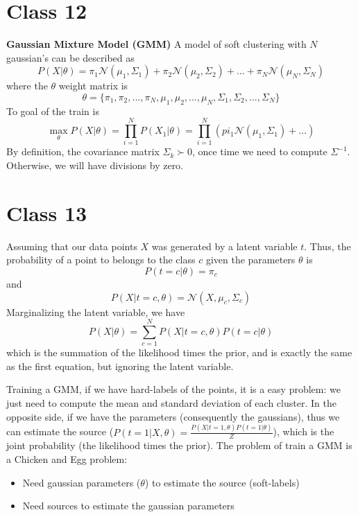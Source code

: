 \documentclass{article}
\begin{document}
\section{Class 12}
\textbf{Gaussian Mixture Model (GMM)}
A model of soft clustering with $N$ gaussian's can be described as
\begin{equation}
    P(X|\theta) = \pi_1\mathcal{N}(\mu_1, \Sigma_1) + \pi_2\mathcal{N}(\mu_2, \Sigma_2) + ... + \pi_N\mathcal{N}(\mu_N, \Sigma_N)
\end{equation}
where the $\theta$ weight matrix is 
\begin{equation}
    \theta = \{\pi_1, \pi_2, ..., \pi_N, \mu_1, \mu_2, ..., \mu_N, \Sigma_1, \Sigma_2, ..., \Sigma_N\}
\end{equation}
To goal of the train is
\begin{equation}
    \max_\theta P(X|\theta) = \prod_{i=1}^N P(X_1|\theta) = \prod_{i=1}^N \left( pi_1\mathcal{N}(\mu_1, \Sigma_1) + ... \right)
\end{equation}
By definition, the covariance matrix $\Sigma_k \succ 0$, once time we need to compute $\Sigma^{-1}$. Otherwise, we will have divisions by zero.

\section{Class 13}
Assuming that our data points $X$ was generated by a latent variable $t$. Thus, the probability of a point to belongs to the class $c$ given the parameters $\theta$ is
\begin{equation}
    P(t = c|\theta) = \pi_c
\end{equation}
and 
\begin{equation}
    P(X|t = c, \theta) = \mathcal{N}(X, \mu_c, \Sigma_c)
\end{equation}
Marginalizing the latent variable, we have
\begin{equation}
    P(X|\theta) = \sum_{c=1}^N P(X|t = c, \theta)P(t = c|\theta)
\end{equation}
which is the summation of the likelihood times the prior, and is exactly the same as the first equation, but ignoring the latent variable.

Training a GMM, if we have hard-labels of the points, it is a easy problem: we just need to compute the mean and standard deviation of each cluster. In the opposite side, if we have the parameters (consequently the gaussians), thus we can estimate the source ($P(t = 1|X, \theta) = \frac{P(X|t = 1, \theta)P(t = 1|\theta)}{Z}$), which is the joint probability (the likelihood times the prior). The problem of train a GMM is a Chicken and Egg problem:
\begin{itemize}
    \item Need gaussian parameters ($\theta$) to estimate the source (soft-labels)
    \item Need sources to estimate the gaussian parameters
\end{itemize}
\end{document}
